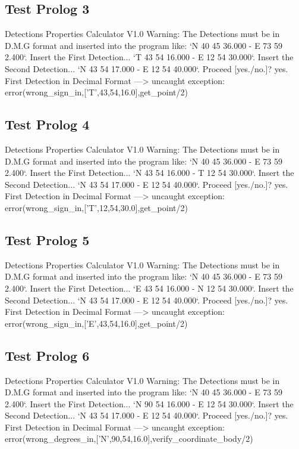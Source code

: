 \documentclass{article}
\begin{document}
\subsection*{Test Prolog 3}
	\begin{spverbatim}
		Detections Properties Calculator V1.0
		Warning: The Detections must be in D.M.G format and inserted into the program like: `N 40 45 36.000 - E 73 59 2.400`.
		Insert the First Detection...
		`T 43 54 16.000 - E 12 54 30.000`.
		Insert the Second Detection...
		`N 43 54 17.000 - E 12 54 40.000`.
		Proceed [yes./no.]?
		yes.
		First Detection in Decimal Format ---> 
		uncaught exception: error(wrong_sign_in,['T',43,54,16.0],get_point/2)
	\end{spverbatim}

\subsection*{Test Prolog 4}
	\begin{spverbatim}
		Detections Properties Calculator V1.0
		Warning: The Detections must be in D.M.G format and inserted into the program like: `N 40 45 36.000 - E 73 59 2.400`.
		Insert the First Detection...
		`N 43 54 16.000 - T 12 54 30.000`.
		Insert the Second Detection...
		`N 43 54 17.000 - E 12 54 40.000`.
		Proceed [yes./no.]?
		yes.
		First Detection in Decimal Format ---> 
		uncaught exception: error(wrong_sign_in,['T',12,54,30.0],get_point/2)
	\end{spverbatim}

\subsection*{Test Prolog 5}
	\begin{spverbatim}
		Detections Properties Calculator V1.0
		Warning: The Detections must be in D.M.G format and inserted into the program like: `N 40 45 36.000 - E 73 59 2.400`.
		Insert the First Detection...
		`E 43 54 16.000 - N 12 54 30.000`.
		Insert the Second Detection...
		`N 43 54 17.000 - E 12 54 40.000`.
		Proceed [yes./no.]?
		yes.
		First Detection in Decimal Format ---> 
		uncaught exception: error(wrong_sign_in,['E',43,54,16.0],get_point/2)
	\end{spverbatim}

\subsection*{Test Prolog 6}
	\begin{spverbatim}
		Detections Properties Calculator V1.0
		Warning: The Detections must be in D.M.G format and inserted into the program like: `N 40 45 36.000 - E 73 59 2.400`.
		Insert the First Detection...
		`N 90 54 16.000 - E 12 54 30.000`.
		Insert the Second Detection...
		`N 43 54 17.000 - E 12 54 40.000`.
		Proceed [yes./no.]?
		yes.
		First Detection in Decimal Format ---> 
		uncaught exception: error(wrong_degrees_in,['N',90,54,16.0],verify_coordinate_body/2)
	\end{spverbatim}
\end{document}

